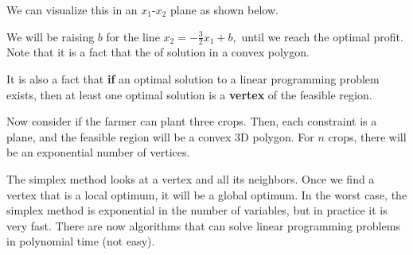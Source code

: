 \documentclass[a4paper,12pt]{article}
\begin{document}
We can visualize this in an $x_1$-$x_2$ plane as shown below.
\begin{center}
\end{center}
We will be raising $b$ for the line $x_2=-\frac{3}{2}x_1+b,$ until we reach the optimal profit. Note that it is a fact that the  of solution in a convex polygon. 

It is also a fact that \textbf{if} an optimal solution to a linear programming problem exists, then at least one optimal solution is a \textbf{vertex} of the feasible region.

Now consider if the farmer can plant three crops. Then, each constraint is a plane, and the feasible region will be a convex 3D polygon. For $n$ crops, there will be an exponential number of vertices. 

The simplex method looks at a vertex and all its neighbors. Once we find a vertex that is a local optimum, it will be a global optimum. In the worst case, the simplex method is exponential in the number of variables, but in practice it is very fast. There are now algorithms that can solve linear programming problems in polynomial time (not easy).
\end{document}
